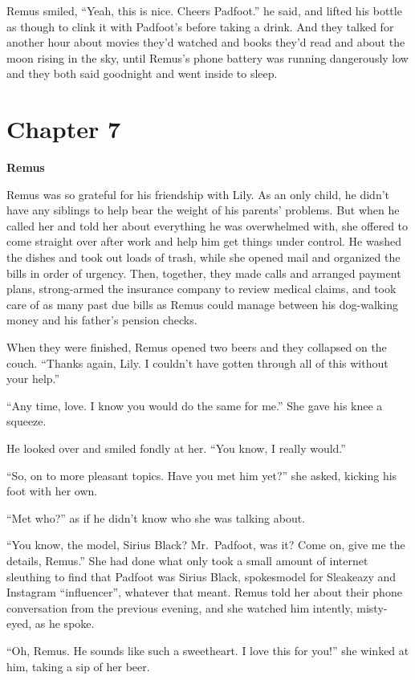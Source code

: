 \documentclass[12pt,twoside,openright]{memoir}
\begin{document}
Remus smiled, ``Yeah, this is nice. Cheers Padfoot.'' he said, and lifted his bottle as though to clink it with Padfoot's before taking a drink. And they talked for another hour about movies they'd watched and books they'd read and about the moon rising in the sky, until Remus's phone battery was running dangerously low and they both said goodnight and went inside to sleep.

\chapter*{Chapter 7}

\textbf{Remus} 

Remus was so grateful for his friendship with Lily. As an only child, he didn't have any siblings to help bear the weight of his parents' problems. But when he called her and told her about everything he was overwhelmed with, she offered to come straight over after work and help him get things under control. He washed the dishes and took out loads of trash, while she opened mail and organized the bills in order of urgency. Then, together, they made calls and arranged payment plans, strong-armed the insurance company to review medical claims, and took care of as many past due bills as Remus could manage between his dog-walking money and his father's pension checks. 

When they were finished, Remus opened two beers and they collapsed on the couch. ``Thanks again, Lily. I couldn't have gotten through all of this without your help.'' 

``Any time, love. I know you would do the same for me.'' She gave his knee a squeeze.

He looked over and smiled fondly at her. ``You know, I really would.''

``So, on to more pleasant topics. Have you met him yet?'' she asked, kicking his foot with her own.

``Met who?'' as if he didn't know who she was talking about.

``You know, the model, Sirius Black? Mr.\ Padfoot, was it? Come on, give me the details, Remus.'' She had done what only took a small amount of internet sleuthing to find that Padfoot was Sirius Black, spokesmodel for Sleakeazy and Instagram ``influencer'', whatever that meant. Remus told her about their phone conversation from the previous evening, and she watched him intently, misty-eyed, as he spoke.

``Oh, Remus. He sounds like such a sweetheart. I love this for you!'' she winked at him, taking a sip of her beer.
\end{document}
